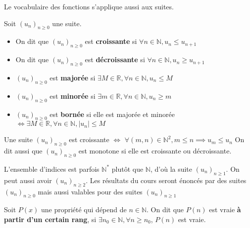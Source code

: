 \begin{remarque}
    Le vocabulaire des fonctions s'applique aussi aux suites.
\end{remarque}

\begin{graybox}
    \begin{definition}
    \par Soit $(u_n)_{n \geqslant 0}$ une suite. 
    \begin{itemize}
        \item On dit que $(u_n)_{n  \geqslant 0}$ est \textbf{croissante} si $\forall n \in \mathbb{N}, u_n \leqslant u_{n + 1}$
        \item On dit que $(u_n)_{n \geqslant 0}$ est \textbf{décroissante} si $\forall n \in \mathbb{N}, u_n \geqslant u_{n+1}$
        \item $(u_n)_{n \geqslant 0}$ est \textbf{majorée} si $\exists M \in \mathbb{R}, \forall n \in \mathbb{N}, u_n \leqslant M$
        \item $(u_n)_{n \geqslant 0}$ est \textbf{minorée} si $\exists m \in \mathbb{R}, \forall n \in \mathbb{N}, u_n \geqslant m$
        \item $(u_n)_{n \geqslant 0}$ est \textbf{bornée} si elle est majorée et minorée $\iff \exists M \in \mathbb{R}, \forall n \in \mathbb{N}, |u_n| \leqslant M$
    \end{itemize}
\end{definition}
\end{graybox}

\begin{remarque}
    \par Une suite $(u_n)_{n \geqslant 0}$ est croissante $\iff$ $\forall (m,n) \in \mathbb{N}^2, m \leqslant n \implies u_m \leqslant u_n$
    On dit aussi que $(u_n)_{n \geqslant 0}$ est monotone si elle est croissante ou décroissante.
\end{remarque}

\begin{remarque}
    \par L'ensemble d'indices est parfois $\mathbb{N}^*$ plutôt que $\mathbb{N}$, d'où la suite $(u_n)_{n \geqslant 1}$.
    On peut aussi avoir $(u_n)_{n \geqslant 2}$. Les résultats du cours seront énoncés par des suites $(u_n)_{n \geqslant 0}$ mais aussi valables pour des suites $(u_n)_{n \geqslant 1}$
\end{remarque}

\begin{remarque}
    \par Soit $P(x)$ une propriété qui dépend de $n \in \mathbb{N}$. On dit que $P(n)$ est vraie \textbf{à partir d'un certain rang}, si $\exists n_0 \in \mathbb{N}, \forall n \geqslant n_0$, $P(n)$ est vraie.
\end{remarque}


